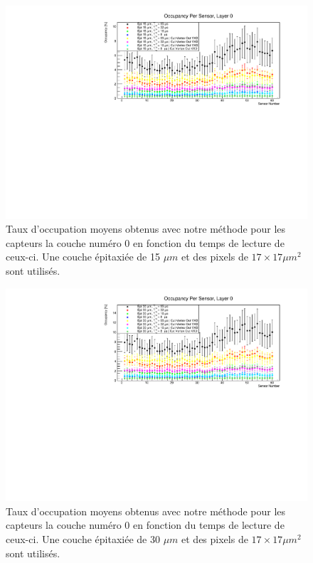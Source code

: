    \begin{figure}[!htb]
    \begin{center}
      \includegraphics[scale=0.80]{./figures/sensors_Readout_Time/resultOccupancyPerSensor/occupancyPerSensor_Layer0_epi15um.pdf}
      \caption{Taux d'occupation moyens obtenus avec notre m\'ethode pour les capteurs la couche num\'ero 0 en fonction du temps de lecture de ceux-ci. Une couche \'epitaxi\'ee de 15 $\mu m$ et des pixels de $17 \times 17 \mu m^2$ sont utilis\'es.}
      \label{fig:OccupancyLayer0_epi15um}
    \end{center}
  \end{figure}
  
   \begin{figure}[!htb]
    \begin{center}
      \includegraphics[scale=0.80]{./figures/sensors_Readout_Time/resultOccupancyPerSensor/occupancyPerSensor_Layer0_epi30um.pdf}
      \caption{Taux d'occupation moyens obtenus avec notre m\'ethode pour les capteurs la couche num\'ero 0 en fonction du temps de lecture de ceux-ci. Une couche \'epitaxi\'ee de 30 $\mu m$ et des pixels de $17 \times 17 \mu m^2$ sont utilis\'es.}
      \label{fig:OccupancyLayer0_epi30um}
    \end{center}
  \end{figure}


